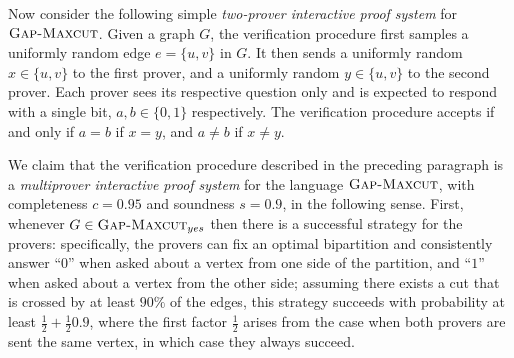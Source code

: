 \documentclass[11pt]{article}
\theoremstyle{definition}
\newcommand{\GX}{\textsc{Gap}\textsc{-}\penalty-1000\textsc{Maxcut}}
\newcommand{\class}[1]{\ensuremath{\mathsf{#1}}\xspace}
\newcommand{\NP}{\class{NP}} %
\newcommand{\IP}{\class{IP}} %
\newcommand{\MIP}{\class{MIP}} %
\newcommand{\tnote}[1]{}
\newcommand{\hnote}[1]{}
\begin{document}
Now consider the following simple \emph{two-prover interactive proof system} for $\GX$. Given a graph $G$, the verification procedure first samples a uniformly random edge $e=\{u,v\}$ in $G$. It then sends a uniformly random $x\in\{u,v\}$ to the first prover, and a uniformly random $y\in \{u,v\}$ to the second prover. Each prover sees its respective question only and is expected to respond with a single bit, $a,b\in\{0,1\}$ respectively. The verification procedure accepts if and only if $a=b$ if $x=y$, and $a\neq b$ if $x\neq y$.

We claim that the verification procedure described in the preceding paragraph is a \emph{multiprover interactive proof system} for the language $\GX$, with completeness $c=0.95$ and soundness $s=0.9$, in the following sense. First, whenever $G\in \GX_{yes}$ then there is a successful strategy for the provers: specifically, the provers can fix an optimal bipartition and consistently answer ``$0$'' when asked about a vertex from one side of the partition, and ``$1$'' when asked about a vertex from the other side; assuming there exists a cut that is crossed by at least $90\%$ of the edges, this strategy succeeds with probability at least $\frac{1}{2} + \frac{1}{2}0.9$, where the first factor $\frac{1}{2}$ arises from the case when both provers are sent the same vertex, in which case they always succeed. 
\end{document}
